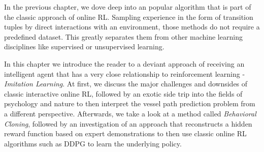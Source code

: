 In the previous chapter, we dove deep into an popular algorithm that is part of the classic approach of online RL. Sampling experience in the form of transition tuples by direct interactions with an environment, those methods do not require a predefined dataset. This greatly separates them from other machine learning disciplines like supervised or unsupervised learning.
\par 
In this chapter we introduce the reader to a deviant approach of receiving an intelligent agent that has a very close relationship to reinforcement learning - \textit{Imitation Learning}. At first, we discuss the major challenges and downsides of classic interactive online RL, followed by an exotic side trip into the fields of psychology and nature to then interpret the vessel path prediction problem from a different perspective. Afterwards, we take a look at a method called \textit{Behavioral Cloning}, followed by an investigation of an approach that reconstructs a hidden reward function based on expert demonstrations to then use classic online RL algorithms such as DDPG to learn the underlying policy. 